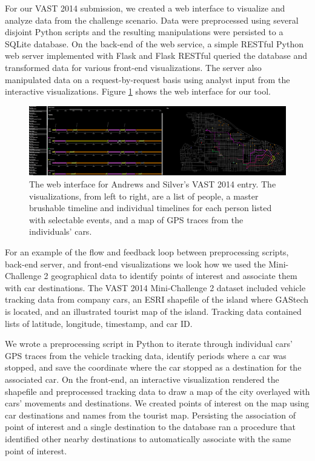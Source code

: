 \documentclass[midd]{thesis}
\begin{document}
For our VAST 2014 submission, we created a web interface to visualize and
analyze data from the challenge scenario. Data were preprocessed using several
disjoint Python scripts and the resulting manipulations were persisted to a
SQLite database. On the back-end of the web service, a simple RESTful Python web
server implemented with Flask \cite{flask} and Flask RESTful
\cite{flask-restful} queried the database and transformed data for various
front-end visualizations. The server also manipulated data on a
request-by-request basis using analyst input from the interactive
visualizations. Figure \ref{fig:vast2014} shows the web interface for our tool.

\begin{figure}[!ht]
  \centering
  \includegraphics[width=1\textwidth]{vast-mc2-2014-cropped-scaled}
  \caption[Web interface for the VAST 2014 entry.]{The web interface for Andrews
  and Silver's VAST 2014 entry. The visualizations, from left to right, are a
  list of people, a master brushable timeline and individual timelines for each
  person listed with selectable events, and a map of GPS traces from the
  individuals' cars.}
  \label{fig:vast2014}
\end{figure}

For an example of the flow and feedback loop between preprocessing scripts,
back-end server, and front-end visualizations we look how we used the
Mini-Challenge 2 geographical data to identify points of interest and associate
them with car destinations. The VAST 2014 Mini-Challenge 2 dataset included
vehicle tracking data from company cars, an ESRI shapefile of the island where
GAStech is located, and an illustrated tourist map of the island. Tracking data
contained lists of latitude, longitude, timestamp, and car ID.

We wrote a preprocessing script in Python to iterate through individual
cars' GPS traces from the vehicle tracking data, identify periods where a car
was stopped, and save the coordinate where the car stopped as a destination for
the associated car. On the front-end, an interactive visualization rendered the
shapefile and preprocessed tracking data to draw a map of the city overlayed
with cars' movements and destinations. We created points of interest on the map
using car destinations and names from the tourist map. Persisting the
association of point of interest and a single destination to the database ran a
procedure that identified other nearby destinations to automatically associate
with the same point of interest.
\end{document}
